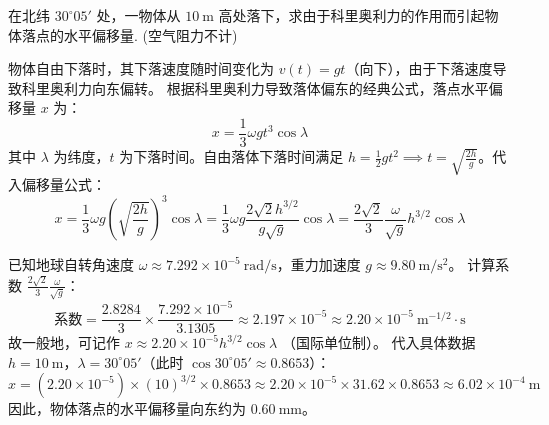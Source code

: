 \begin{exercise}\label{ex:3.9}
在北纬 $30^\circ 05'$ 处，一物体从 $10 \ \mathrm{m}$ 高处落下，求由于科里奥利力的作用而引起物体落点的水平偏移量. (空气阻力不计)
\end{exercise}
\begin{solution}
物体自由下落时，其下落速度随时间变化为 $v(t) = gt$（向下），由于下落速度导致科里奥利力向东偏转。
根据科里奥利力导致落体偏东的经典公式，落点水平偏移量 $x$ 为：
$$ x = \frac{1}{3} \omega g t^3 \cos\lambda $$
其中 $\lambda$ 为纬度，$t$ 为下落时间。自由落体下落时间满足 $h = \frac{1}{2}gt^2 \implies t = \sqrt{\frac{2h}{g}}$。代入偏移量公式：
$$ x = \frac{1}{3} \omega g \left( \sqrt{\frac{2h}{g}} \right)^3 \cos\lambda = \frac{1}{3} \omega g \frac{2\sqrt{2} h^{3/2}}{g\sqrt{g}} \cos\lambda = \frac{2\sqrt{2}}{3} \frac{\omega}{\sqrt{g}} h^{3/2} \cos\lambda $$

已知地球自转角速度 $\omega \approx 7.292 \times 10^{-5} \ \mathrm{rad/s}$，重力加速度 $g \approx 9.80 \ \mathrm{m/s^2}$。
计算系数 $\frac{2\sqrt{2}}{3} \frac{\omega}{\sqrt{g}}$：
$$ \text{系数} = \frac{2.8284}{3} \times \frac{7.292 \times 10^{-5}}{3.1305} \approx 2.197 \times 10^{-5} \approx 2.20 \times 10^{-5} \ \mathrm{m^{-1/2} \cdot s} $$
故一般地，可记作 $x \approx 2.20 \times 10^{-5} h^{3/2} \cos\lambda$ （国际单位制）。
代入具体数据 $h = 10 \ \mathrm{m}$，$\lambda = 30^\circ 05'$（此时 $\cos 30^\circ 05' \approx 0.8653$）：
$$ x = (2.20 \times 10^{-5}) \times (10)^{3/2} \times 0.8653 \approx 2.20 \times 10^{-5} \times 31.62 \times 0.8653 \approx 6.02 \times 10^{-4} \ \mathrm{m} $$
因此，物体落点的水平偏移量向东约为 $0.60 \ \mathrm{mm}$。
\end{solution}


